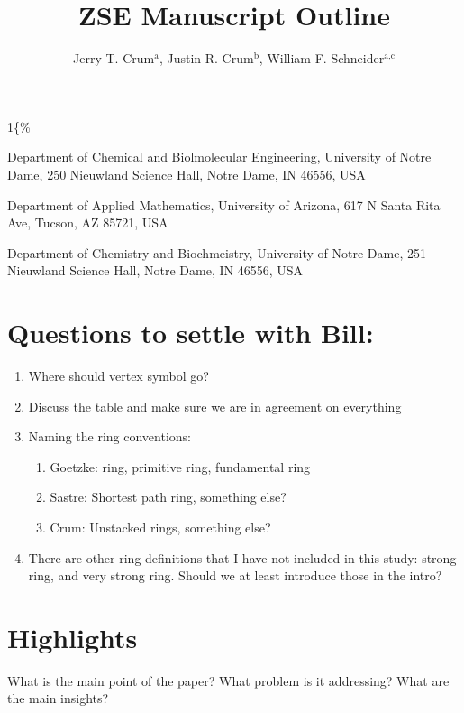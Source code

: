 \documentclass[11pt]{article}
\author{Jerry T. Crum\(^{\text{a}}\), Justin R. Crum\(^{\text{b}}\), William F. Schneider\(^{\text{a,c}}\)}
\date{}
\title{ZSE Manuscript Outline}
\begin{document}
\begin{OPTIONS}
\def\udesoftecoverride\#1\mainmatter\{\%
  \AfterEndPreamble{#1\mainmatter}
\end{OPTIONS}

\maketitle

\begin{asparaenum}[\expandafter\textsuperscript a ]
\item Department of Chemical and Biolmolecular Engineering, University of Notre Dame, 250 Nieuwland Science Hall, Notre Dame, IN 46556, USA \\
\item Department of Applied Mathematics, University of Arizona, 617 N Santa Rita Ave, Tucson, AZ 85721, USA\\
\item Department of Chemistry and Biochmeistry, University of Notre Dame, 251 Nieuwland Science Hall, Notre Dame, IN 46556, USA
\end{asparaenum}

\newpage
\section*{Questions to settle with Bill:}
\label{sec:org41438e4}
\begin{enumerate}
\item Where should vertex symbol go?
\item Discuss the table and make sure we are in agreement on everything
\item Naming the ring conventions:
\begin{enumerate}
\item Goetzke: ring, primitive ring, fundamental ring \cite{marians-network-1990,guttman-ring-1990,goetzke-properties-1991}
\item Sastre: Shortest path ring, something else?
\item Crum: Unstacked rings, something else?
\end{enumerate}
\item There are other ring definitions that I have not included in this study: strong ring, and very strong ring. Should we at least introduce those in the intro?
\end{enumerate}

\section*{Highlights}
\label{sec:org6acb588}
What is the main point of the paper? What problem is it addressing? What are the main insights?
\end{document}
